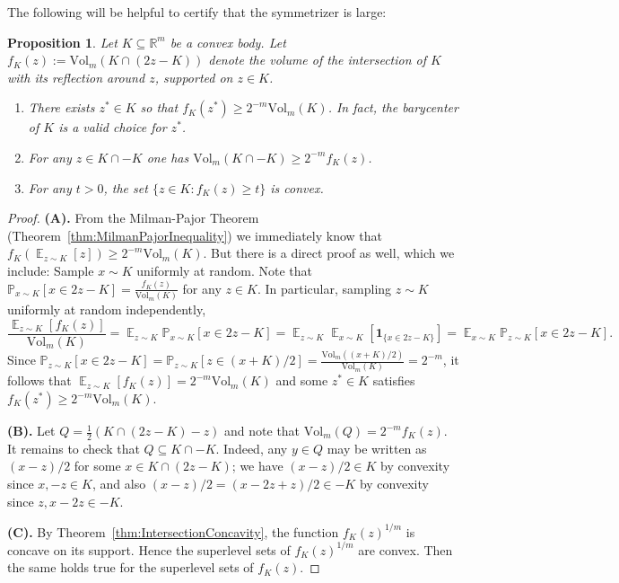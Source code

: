 \documentclass[12pt,english]{article}
\theoremstyle{theorem}
\newtheorem{proposition}[theorem]{Proposition}
\theoremstyle{remark}
\providecommand{\setR}{\mathbb{R}}
\newcommand{\E}{\mathop{\mathbb{E}}}
\newcommand{\Vol}{\mathrm{Vol}}
\newcommand{\eps}{\varepsilon}
\begin{document}
The following will be helpful to certify that the symmetrizer is large:
\begin{proposition} \label{prop:reflectionVolume}
  Let $K \subseteq \setR^m$ be a convex body. Let $f_K(z) := \Vol_m(K \cap (2z-K))$ denote the volume of the intersection of $K$ with its reflection around $z$, supported on $z \in K$.
  \begin{enumerate}
  \item[(A)] There exists $z^* \in K$ so that $f_K(z^*) \ge 2^{-m} \Vol_m (K)$. In fact, the barycenter of $K$ is a valid choice for $z^*$. 
  \item[(B)] For any $z \in K \cap -K$ one has $\Vol_m (K \cap -K) \ge 2^{-m} f_K(z)$.
  \item[(C)] For any $t > 0$, the set $\{z \in K: f_K(z) \ge t\}$ is convex.
  \end{enumerate}
\end{proposition}
\begin{proof}
{\bf (A).}  From the Milman-Pajor Theorem (Theorem~\ref{thm:MilmanPajorInequality}) we immediately know that $f_K(\E_{z \sim K}[z]) \geq 2^{-m}\Vol_m(K)$. But there is a direct proof as well, which we include:
  Sample $x \sim K$ uniformly at random. Note that $\mathbb{P}_{x \sim K} [x \in 2z-K] = \frac{f_K(z)}{\Vol_m(K)}$ for any $z \in K$. In particular, sampling $z \sim K$ uniformly at random independently,
\[ \frac{\E_{z \sim K} [f_K(z)]}{\Vol_m (K)} = \E_{z \sim K} \mathbb{P}_{x \sim K} [x \in 2z-K] = \E_{z \sim K} \E_{x \sim K} [\mathbf{1}_{\{x \in 2z-K\}}] = \E_{x \sim K} \mathbb{P}_{z\sim K} [x \in 2z-K].\]
Since $\mathbb{P}_{z\sim K} [x \in 2z-K] = \mathbb{P}_{z\sim K} [z \in (x+K)/2] = \frac{\Vol_m((x+K)/2)}{\Vol_m(K)} = 2^{-m}$, it follows that $\E_{z \sim K} [f_K(z)] = 2^{-m} \Vol_m (K)$ and some $z^* \in K$ satisfies $f_K(z^*) \ge 2^{-m} \Vol_m (K)$.

{\bf (B).} Let $Q = \frac{1}{2} (K \cap (2z-K) - z)$ and note that $\Vol_m (Q) = 2^{-m} f_K(z)$. It remains to check that $Q \subseteq K \cap -K$. Indeed, any $y \in Q$ may be written as $(x-z)/2$ for some $x \in K \cap (2z-K)$; we have $(x-z)/2 \in K$ by convexity since $x, -z \in K$, and also $(x-z)/2 = (x-2z+z)/2 \in -K$ by convexity since $z, x-2z \in -K$.

{\bf (C).} By Theorem~\ref{thm:IntersectionConcavity}, the function $f_K(z)^{1/m}$ is concave on its support. Hence the superlevel sets of $f_K(z)^{1/m}$ are convex. Then the same holds true for the superlevel sets of $f_K(z)$.
\end{proof}
\end{document}
